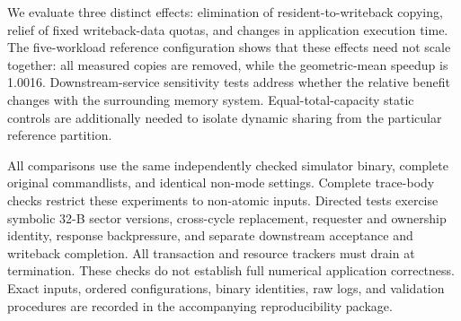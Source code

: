 
\begin{abstract}
A fixed-partition L2 may relocate a dirty victim into a writeback buffer before reusing its resident slot. Elastic Payload L2 (EP-L2) replaces this relocation with an ownership transfer: the victim retains its physical slot, the incoming resident receives a distinct bank-compatible slot, and writeback ordering remains tracked independently. We compare this WB-only organization with a fixed-partition reference under equal resident-tag, payload-capacity, and modeled bank-service budgets. Across five non-atomic trace-driven workloads, EP-L2 removes all measured resident-to-writeback copies but achieves a geometric-mean speedup of 1.0016, including one slowdown. Three workloads eliminate writeback-data-full admission denials while exhibiting more downstream queue-admission denials. The results demonstrate copy removal without isolating an application-performance benefit from dynamic sharing. Validation covers symbolic sector versions and transaction lifecycles rather than numerical SASS outputs; physical implementation costs remain to be measured.
\end{abstract}

We evaluate three distinct effects: elimination of resident-to-writeback copying, relief of fixed writeback-data quotas, and changes in application execution time. The five-workload reference configuration shows that these effects need not scale together: all measured copies are removed, while the geometric-mean speedup is 1.0016. Downstream-service sensitivity tests address whether the relative benefit changes with the surrounding memory system. Equal-total-capacity static controls are additionally needed to isolate dynamic sharing from the particular reference partition.

All comparisons use the same independently checked simulator binary, complete original commandlists, and identical non-mode settings. Complete trace-body checks restrict these experiments to non-atomic inputs. Directed tests exercise symbolic 32-B sector versions, cross-cycle replacement, requester and ownership identity, response backpressure, and separate downstream acceptance and writeback completion. All transaction and resource trackers must drain at termination. These checks do not establish full numerical application correctness. Exact inputs, ordered configurations, binary identities, raw logs, and validation procedures are recorded in the accompanying reproducibility package.

